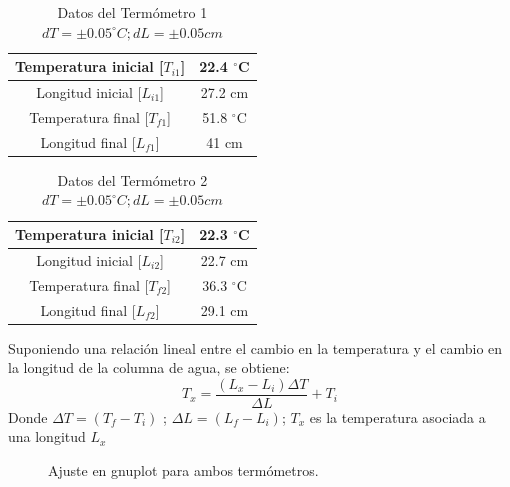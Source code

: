 \documentclass{article}
\begin{document}
\begin{table}[H]
  \centering
    \begin{tabular}{|c|c|} \hline
    
    Temperatura inicial [$T_{i1}$] & 22.4 $^{\circ}$C \\ \hline
    Longitud inicial [$L_{i1}$]     & 27.2 cm\\ \hline
    Temperatura final [$T_{f1}$]    & 51.8 $^{\circ}$C \\ \hline
    Longitud final [$L_{f1}$]     & 41 cm \\ \hline
    
    \end{tabular}%
\caption{Datos del Termómetro 1 $d T=\pm 0.05^{\circ}C ; d L=\pm 0.05cm$}


\end{table}%


\begin{table}[H]
  \centering
    \begin{tabular}{|c|c|} \hline
    Temperatura inicial [$T_{i2}$] & 22.3  $^{\circ}$C \\ \hline
    Longitud inicial [$L_{i2}$]    & 22.7 cm\\ \hline
    Temperatura final [$T_{f2}$]    & 36.3 $^{\circ}$C \\ \hline
    Longitud final [$L_{f2}$]     & 29.1 cm \\ \hline
    
    \end{tabular}%
\caption{Datos del Termómetro 2 $d T= \pm 0.05^{\circ}C ;  dL = \pm 0.05cm$}


\end{table}%

Suponiendo una relación lineal entre el cambio en la temperatura y el cambio en la longitud de la columna de agua, se obtiene:
$$T_{x}=\frac{(L_{x}-L_{i})\Delta T}{\Delta L} + T_{i}$$
Donde $\Delta T = (T_{f}-T_{i})$ ; $\Delta L = (L_{f}-L_{i})$; $T_{x}$ es la temperatura asociada a una longitud $L_{x}$

 \begin{figure}[H]%
    \centering
    \qquad
    \caption{Ajuste en gnuplot para ambos termómetros.}%
    \label{fig:example}%
\end{figure}
\end{document}
